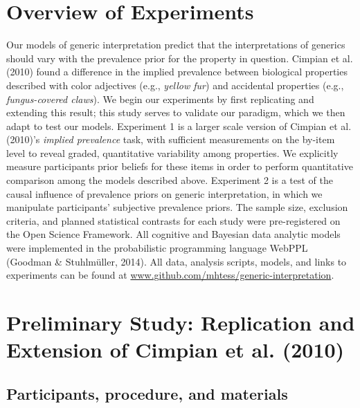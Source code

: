 \documentclass[floatsintext,doc]{apa6}
\begin{document}
\hypertarget{overview-of-experiments}{%
\section{Overview of Experiments}\label{overview-of-experiments}}

Our models of generic interpretation predict that the interpretations of generics should vary with the prevalence prior for the property in question.
Cimpian et al. (2010) found a difference in the implied prevalence between biological properties described with color adjectives (e.g., \emph{yellow fur}) and accidental properties (e.g., \emph{fungus-covered claws}).
We begin our experiments by first replicating and extending this result; this study serves to validate our paradigm, which we then adapt to test our models.
Experiment 1 is a larger scale version of Cimpian et al. (2010)'s \emph{implied prevalence} task, with sufficient measurements on the by-item level to reveal graded, quantitative variability among properties. We explicitly measure participants prior beliefs for these items in order to perform quantitative comparison among the models described above.
Experiment 2 is a test of the causal influence of prevalence priors on generic interpretation, in which we manipulate participants' subjective prevalence priors.
The sample size, exclusion criteria, and planned statistical contrasts for each study were pre-registered on the Open Science Framework.
All cognitive and Bayesian data analytic models were implemented in the probabilistic programming language WebPPL (Goodman \& Stuhlmüller, 2014).
All data, analysis scripts, models, and links to experiments can be found at \url{www.github.com/mhtess/generic-interpretation}.

\hypertarget{preliminary-study-replication-and-extension-of-cimpian-et-al.-2010}{%
\section{Preliminary Study: Replication and Extension of Cimpian et al. (2010)}\label{preliminary-study-replication-and-extension-of-cimpian-et-al.-2010}}


\hypertarget{participants}{%
\subsection{Participants, procedure, and materials}\label{participants}}
\end{document}
